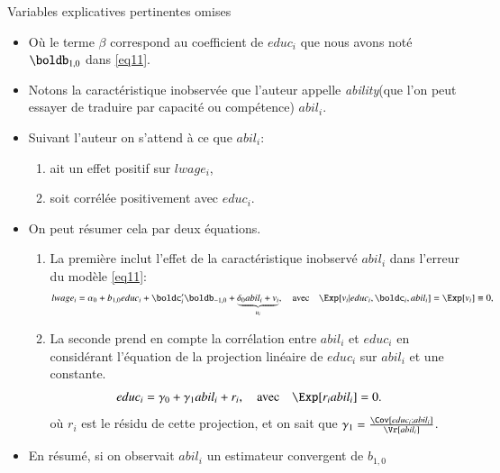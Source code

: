 \begin{frame}[allowframebreaks]{Variables explicatives pertinentes omises}
\begin{itemize}
\begin{mdframed}
\end{mdframed}
            \item Où le terme $\beta$ correspond au coefficient de $educ_i$ que nous avons noté $\boldb_{1, 0}$ dans 
            \eqref{eq11}.
            \item Notons la caractéristique inobservée que l'auteur appelle \emph{ability}(que l'on peut essayer de
             traduire par capacité ou compétence) $abil_i$.
            \item Suivant l'auteur on s'attend à ce que $abil_i$:
            \begin{enumerate}[$\star$]
            \item ait un effet positif sur $lwage_i$, 
            \item soit corrélée positivement avec $educ_i$. 
            \end{enumerate}
            \item On peut résumer cela par deux équations.
            \begin{enumerate}[$\star$]
            \item La première inclut l'effet de la caractéristique inobservé $abil_i$ dans l'erreur 
            du modèle \eqref{eq11}:
            \begin{align}
                lwage_i&= \alpha_0 + b_{1, 0}educ_i + \boldc_i^\prime\boldb_{-1, 0} 
                + \underbrace{\delta_0 abil_i + v_i}_{u_i}, 
                \quad \text{avec} \quad \Exp[v_i | educ_i, \boldc_i, abil_i] = \Exp[v_i]\equiv 0,
                \label{eq12}
            \end{align}
            \item La seconde prend en compte la corrélation entre $abil_i$ et $educ_i$ en considérant 
            l'équation de la projection linéaire de $educ_i$ sur $abil_i$ et une constante.
            \begin{align}
                educ_i &= \gamma_0 + \gamma_1abil_i + r_i, \quad \text{avec} \quad 
                \Exp[r_i abil_i] = 0.
                \label{eq13}
            \end{align}
            où $r_i$ est le résidu de cette projection, et on sait que $\gamma_1 = 
            \frac{\Cov[educ_i; abil_i]}{\Vr[abil_i]}$.
        \end{enumerate}
        \item En résumé, si on observait $abil_i$ un estimateur convergent de $b_{1, 0}$ 

\end{itemize}
\end{frame}
